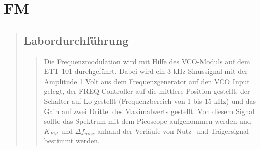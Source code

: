 \section{FM}
\begin{quote}
    
    
    \subsection{Labordurchführung}
    \begin{quote}
    
        Die Frequenzmodulation wird mit Hilfe des VCO-Moduls auf dem ETT 101 durchgeführt. Dabei wird ein 3 kHz Sinussignal mit
        der Amplitude 1 Volt aus dem Frequenzgenerator auf den VCO Input gelegt, der FREQ-Controller auf die mittlere Position
        gestellt, der Schalter auf Lo gestellt (Frequenzbereich von 1 bis 15 kHz) und das Gain auf zwei Drittel des Maximalwerts
        gestellt.
        Von diesem Signal sollte das Spektrum mit dem Picoscope aufgenommen werden und $K_{FM}$ und $\Delta f_{max}$ anhand der
        Verläufe von Nutz- und Trägersignal bestimmt werden.\\
        

\end{quote}
\end{quote}
